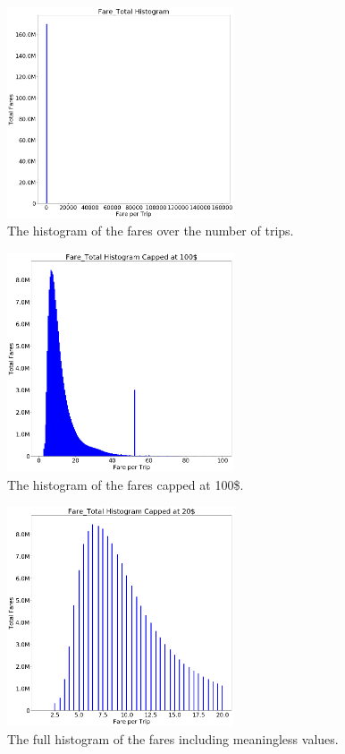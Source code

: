 \documentclass[a4paper]{article}
\begin{document}
\begin{figure}
  \centering
  \includegraphics[width=0.6\textwidth]{images/distribution-fares-bad.png}
  \caption{The histogram of the fares over the number of trips.}
  \label{fig:distribution-fares-bad}
\end{figure}

\begin{figure}
  \centering
  \includegraphics[width=0.6\textwidth]{images/distribution-fares-to-100.png}
  \caption{The histogram of the fares capped at 100\$.}
  \label{fig:distribution-fares-capped}
\end{figure}

\begin{figure}
  \centering
  \includegraphics[width=0.6\textwidth]{images/distribution-fares-fix.png}
  \caption{The full histogram of the fares including meaningless values.}
  \label{fig:distribution-fares}
\end{figure}
\end{document}

